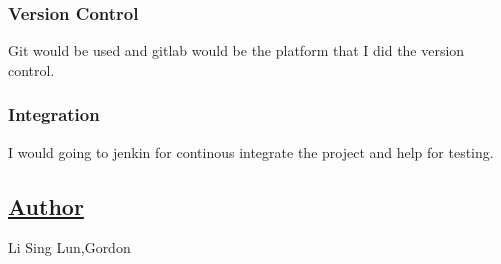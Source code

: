 \subsubsection*{Version Control}

Git would be used and gitlab would be the platform that I did the version control.

\subsubsection*{Integration}

I would going to jenkin for continous integrate the project and help for testing.

\subsection*{\mbox{\hyperlink{class_author}{Author}}}

Li Sing Lun,Gordon 